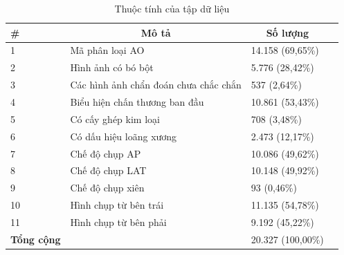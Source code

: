 \documentclass[../the.tex]{subfiles}
\begin{document}
\begin{table}[!ht]
	\caption{Thuộc tính của tập dữ liệu}
	\centering
	\begin{tabular}{|p{2cm}|p{4cm}|p{3.5cm}|p{2cm}|}
		\hline
		\multicolumn{1}{|l|}{
		\textbf{\#}} 
		& \multicolumn{1}{c|}{\textbf{Mô tả}} 
		& \multicolumn{1}{c|}{\textbf{Số lượng}} \\
		\hline
	
		 1
		& Mã phân loại AO 
		& 14.158 (69,65\%)\\
		\hline
		
		 2
		& Hình ảnh có bó bột 
		& 5.776 (28,42\%)\\
		\hline
		
		 3
		& Các hình ảnh chẩn đoán chưa chắc chắn 
		& 537 (2,64\%) \\
        \hline
        
		 4
		& Biểu hiện chấn thương ban đầu
		& 10.861 (53,43\%) \\
        \hline
        
		 5
		& Có cấy ghép kim loại
		& 708 (3,48\%) \\
        \hline
        
		 6
		& Có dấu hiệu loãng xương
		& 2.473 (12,17\%) \\
        \hline
        
		 7
		& Chế độ chụp AP
		& 10.086 (49,62\%) \\
        \hline
        
		 8
		& Chế độ chụp LAT
		& 10.148 (49,92\%) \\
        \hline
        
		 9
		& Chế độ chụp xiên
		& 93 (0,46\%) \\
        \hline
        
		 10
		& Hình chụp từ bên trái
		& 11.135 (54,78\%) \\
        \hline
        
		 11
		& Hình chụp từ bên phải
		& 9.192 (45,22\%) \\
        \hline
        
		 \textbf{Tổng cộng}
		& 
		& 20.327 (100,00\%) \\
		\hline
	\end{tabular}
	
	\label{tab:dataset}
\end{table}
\end{document}
